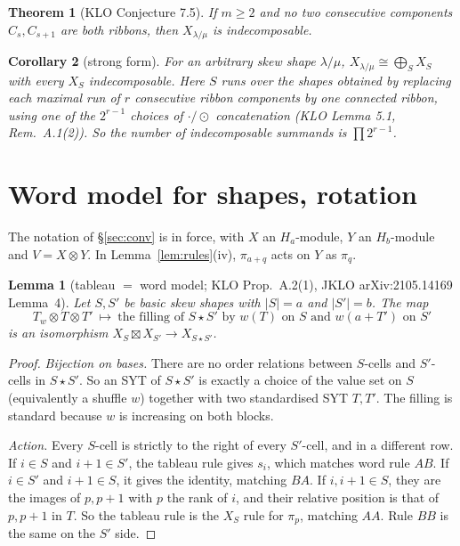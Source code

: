 \documentclass[11pt]{amsart}
\newcommand{\sq}{\boxtimes}
\theoremstyle{plain}
\newtheorem{theorem}{Theorem}
\newtheorem{corollary}[theorem]{Corollary}
\newtheorem{lemmaII}{Lemma}
\theoremstyle{definition}
\begin{document}
\begin{theorem}[KLO Conjecture 7.5]\label{thm:B}
If $m\ge2$ and no two consecutive components $C_s,C_{s+1}$ are both ribbons, then $X_{\lambda/\mu}$ is indecomposable.
\end{theorem}

\begin{corollary}[strong form]\label{cor:C}
For an arbitrary skew shape $\lambda/\mu$, $X_{\lambda/\mu}\cong\bigoplus_SX_S$ with every $X_S$ indecomposable. Here $S$ runs over the shapes obtained by replacing each maximal run of $r$ consecutive ribbon components by one connected ribbon, using one of the $2^{r-1}$ choices of $\cdot/\odot$ concatenation (KLO Lemma 5.1, Rem.~A.1(2)). So the number of indecomposable summands is $\prod2^{r-1}$.
\end{corollary}

\section{Word model for shapes, rotation}

The notation of \S\ref{sec:conv} is in force, with $X$ an $H_a$-module, $Y$ an $H_b$-module and $V=X\otimes Y$. In Lemma~\ref{lem:rules}(iv), $\pi_{a+q}$ acts on $Y$ as $\pi_q$.

\begin{lemmaII}[tableau $=$ word model; KLO Prop.~A.2(1), JKLO arXiv:2105.14169 Lemma~4]\label{II:W}
Let $S,S'$ be basic skew shapes with $|S|=a$ and $|S'|=b$. The map
\[
T_w\otimes T\otimes T'\ \longmapsto\ \text{the filling of }S\star S'\text{ by }w(T)\text{ on }S\text{ and }w(a+T')\text{ on }S'
\]
is an isomorphism $X_S\sq X_{S'}\to X_{S\star S'}$.
\end{lemmaII}

\begin{proof}
\emph{Bijection on bases.} There are no order relations between $S$-cells and $S'$-cells in $S\star S'$. So an SYT of $S\star S'$ is exactly a choice of the value set on $S$ (equivalently a shuffle $w$) together with two standardised SYT $T,T'$. The filling is standard because $w$ is increasing on both blocks.

\emph{Action.} Every $S$-cell is strictly to the right of every $S'$-cell, and in a different row. If $i\in S$ and $i+1\in S'$, the tableau rule gives $s_i$, which matches word rule $AB$. If $i\in S'$ and $i+1\in S$, it gives the identity, matching $BA$. If $i,i+1\in S$, they are the images of $p,p+1$ with $p$ the rank of $i$, and their relative position is that of $p,p+1$ in $T$. So the tableau rule is the $X_S$ rule for $\pi_p$, matching $AA$. Rule $BB$ is the same on the $S'$ side.
\end{proof}
\end{document}

